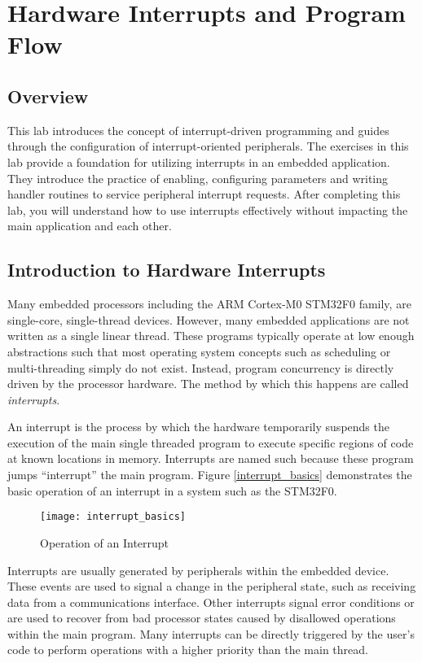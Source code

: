 \documentclass[11pt,fleqn]{book} %
\begin{document}
	
\chapter{Hardware Interrupts and Program Flow}

\section{Overview}
This lab introduces the concept of interrupt-driven programming and guides through the configuration of interrupt-oriented peripherals. The exercises in this lab provide a foundation for utilizing interrupts in an embedded application. They introduce the practice of enabling, configuring parameters and writing handler routines to service peripheral interrupt requests. After completing this lab, you will understand how to use interrupts effectively without impacting the main application and each other. 

\section{Introduction to Hardware Interrupts}
Many embedded processors including the ARM Cortex-M0 STM32F0 family, are single-core, single-thread devices. However, many embedded applications are not written as a single linear thread. These programs typically operate at low enough abstractions such that most operating system concepts such as scheduling or multi-threading simply do not exist. Instead, program concurrency is directly driven by the processor hardware. The method by which this happens are called \textit{interrupts}. 

An interrupt is the process by which the hardware temporarily suspends the execution of the main single threaded program to execute specific regions of code at known locations in memory. Interrupts are named such because these program jumps ``interrupt'' the main program. Figure \vref{interrupt_basics} demonstrates the basic operation of an interrupt in a system such as the STM32F0. 

\begin{figure}[h]
    \centering\texttt{[image: interrupt\_basics]}
    \caption{Operation of an Interrupt}
    \label{interrupt_basics}
\end{figure}

Interrupts are usually generated by peripherals within the embedded device. These events are used to signal a change in the peripheral state, such as receiving data from a communications interface. Other interrupts signal error conditions or are used to recover from bad processor states caused by disallowed operations within the main program. Many interrupts can be directly triggered by the user's code to perform operations with a higher priority than the main thread. 
\end{document}
